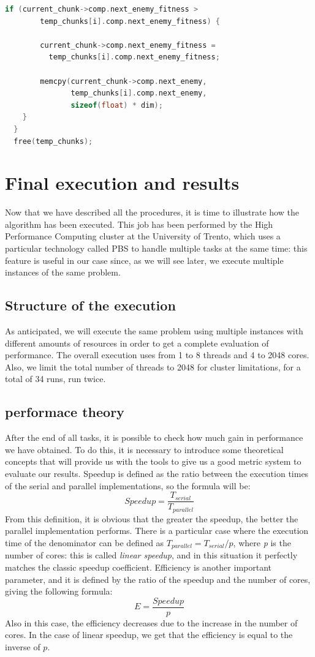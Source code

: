 \documentclass[10pt]{article}
\begin{document}
\begin{multicols}{2}
\begin{lstlisting}[language=C,caption={the parallel version of \textit{computation\_accumulate}}]
    if (current_chunk->comp.next_enemy_fitness >
        temp_chunks[i].comp.next_enemy_fitness) {

        current_chunk->comp.next_enemy_fitness =
          temp_chunks[i].comp.next_enemy_fitness;

        memcpy(current_chunk->comp.next_enemy, 
               temp_chunks[i].comp.next_enemy,
               sizeof(float) * dim);
    }
  }
  free(temp_chunks);
  \end{lstlisting}


\section{Final execution and results}
Now that we have described all the procedures, it is time to illustrate how 
the algorithm has been executed. This job has been performed by the
High Performance Computing cluster at the University of Trento, which 
uses a particular technology called PBS to handle multiple tasks at the same
time: this feature is useful in our case since, as we will see later, we 
execute multiple instances of the same problem.
\subsection*{Structure of the execution}

As anticipated, we will execute the same problem using multiple instances with different amounts of
resources in order to get a complete evaluation of performance. The overall execution uses from 1 to 8
threads and 4 to 2048 cores. Also, we limit the total number of threads to 2048 for cluster limitations, for a total of 34 runs, run twice.

\subsection*{performace theory}

After the end of all tasks, it is possible to check how much gain in performance we have obtained.
To do this, it is necessary to introduce some theoretical concepts that will provide us with the tools 
to give us a good metric system to evaluate our results. Speedup is defined as the ratio between the execution times of the serial and parallel
implementations, so the formula will be: $$Speedup = \frac{T_{serial}}{T_{parallel}}$$ 
From this definition, it is obvious that the greater the speedup, the better the parallel implementation
performs. There is a particular case where the execution time of the denominator can be defined
as $T_{parallel}=T_{serial}/p$, where \textit{p} is the number of cores: this is called \textit{linear speedup},
and in this situation it perfectly matches the classic speedup coefficient.
Efficiency is another important parameter, and it is defined by the ratio of the speedup and the 
number of cores, giving the following formula: $$E = \frac{Speedup}{p}$$
Also in this case, the efficiency decreases due to the increase in the number of cores. In the case
of linear speedup, we get that the efficiency is equal to the inverse of $p$.

\end{multicols}
\end{document}
